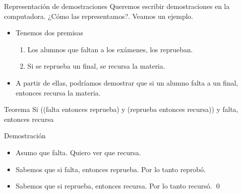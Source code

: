 \documentclass[xcolor={dvipsnames},spanish]{beamer}
\begin{document}
\begin{frame}{Representación de demostraciones}
    Queremos escribir demostraciones en la computadora. ¿Cómo las representamos?. Veamos un ejemplo.
    
    \begin{itemize}
        \item Tenemos dos premisas
        \begin{enumerate}
            \item Los alumnos que faltan a los exámenes, los reprueban.
            \item Si se reprueba un final, se recursa la materia.
        \end{enumerate}
        \item A partir de ellas, podríamos demostrar que si un alumno falta a un final, entonces recursa la materia.
    \end{itemize}

    \begin{block}{Teorema}
        Si ((falta entonces reprueba) y (reprueba entonces recursa)) y falta, entonces recursa
    \end{block}
    \begin{exampleblock}{Demostración}
        \begin{itemize}
    \item Asumo que falta. Quiero ver que recursa.
    \item Sabemos que si falta, entonces reprueba. Por lo tanto reprobó.
    \item Sabemos que si reprueba, entonces recursa. Por lo tanto recursó. \qed
\end{itemize}
    \end{exampleblock}
\end{frame}
\end{document}
